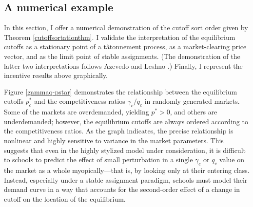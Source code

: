 \documentclass[12pt]{article}
\theoremstyle{definition}
\begin{document}
\subsection{A numerical example}
In this section, I offer a numerical demonstration of the cutoff sort order given by Theorem \ref{cutoffsortationthm}. I validate the interpretation of the equilibrium cutoffs as a stationary point of a t\^{a}tonnement process, as a market-clearing price vector, and as the limit point of stable assignments. (The demonstration of the latter two interpretations follows Azevedo and Leshno \parencite*{supplydemandfw}.) Finally, I represent the incentive results above graphically.

Figure \ref{gammaq-pstar} demonstrates the relationship between the equilibrium cutoffs $p_c^*$ and the competitiveness ratios $\gamma_c / q_c$ in randomly generated markets. Some of the markets are overdemanded, yielding $p^* > 0$, and others are underdemanded; however, the equilibrium cutoffs are always ordered according to the competitiveness ratios. As the graph indicates, the precise relationship is nonlinear and highly sensitive to variance in the market parameters. This suggests that even in the highly stylized model under consideration, it is difficult to schools to predict the effect of small perturbation in a single $\gamma_c$ or $q_c$ value on the market as a whole myopically---that is, by looking only at their entering class. Instead, especially under a stable assignment paradigm, schools must model their demand curve in a way that accounts for the second-order effect of a change in cutoff on the location of the equilibrium.
\end{document}
